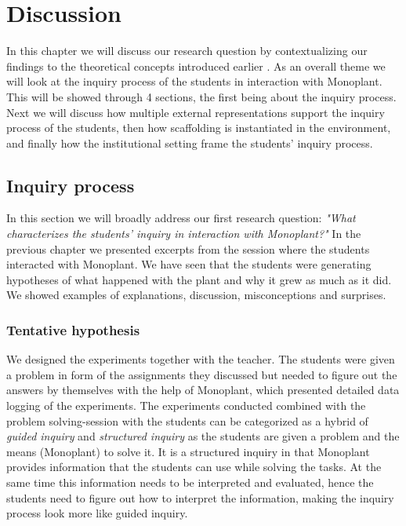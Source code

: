\chapter{Discussion}
In this chapter we will discuss our research question by contextualizing our findings to the theoretical concepts introduced earlier . As an overall theme we will look at the inquiry process of the students in interaction with Monoplant. This will be showed through 4 sections, the first being about the inquiry process. Next we will discuss how multiple external representations support the inquiry process of the students, then how scaffolding is instantiated in the environment, and finally how the institutional setting frame the students' inquiry process.


\section{Inquiry process}
In this section we will broadly address our first research question: \emph{"What characterizes the students’ inquiry in interaction with Monoplant?"}
In the previous chapter we presented excerpts from the session where the students interacted with Monoplant. We have seen that the students were generating hypotheses of what happened with the plant and why it grew as much as it did. We showed examples of explanations, discussion, misconceptions and surprises.

\subsection{Tentative hypothesis}
We designed the experiments together with the teacher. The students were given a problem in form of the assignments they discussed but needed to figure out the answers by themselves with the help of Monoplant, which presented detailed data logging of the experiments. The experiments conducted combined with the problem solving-session with the students can be categorized as a hybrid of \emph{guided inquiry} and \emph{structured inquiry} \citetext{\citet{staver1987analysis}, referenced in \citealp{prince2006inductive}} as the students are given a problem and the means (Monoplant) to solve it. It is a structured inquiry in that Monoplant provides information that the students can use while solving the tasks. At the same time this information needs to be interpreted and evaluated, hence the students need to figure out how to interpret the information, making the inquiry process look more like guided inquiry.



